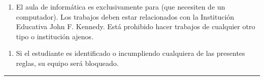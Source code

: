 \documentclass[letterpaper,10pt,spanish]{sphinxmanual}
\begin{document}
\begin{enumerate}
%
\setcounter{enumi}{6}
\item {} 
\sphinxAtStartPar
El aula de informática es exclusivamente para  (que necesiten de un computador). Los trabajos deben estar relacionados con la Institución Educativa John F. Kennedy. Está prohibido hacer trabajos de cualquier otro tipo o institución ajenos.

\end{enumerate}
\begin{enumerate}
%
\setcounter{enumi}{7}
\item {} 
\sphinxAtStartPar
Si el estudiante es identificado  o incumpliendo cualquiera de las presentes reglas, su equipo será bloqueado.

\end{enumerate}


\bigskip\hrule\bigskip
\end{document}
